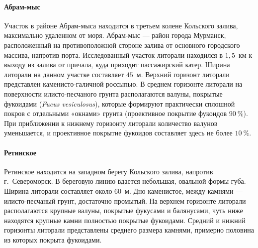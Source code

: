             \paragraph{Абрам-мыс}
Участок  в районе  Абрам-мыса  находится в третьем колене Кольского залива, максимально удаленном от моря.
Абрам-мыс --- район   города   Мурманск,  расположенный   на противоположной стороне залива от основного городского массива, напротив порта. 
Исследованный участок   литорали   находился   в   $1,5$~км   к   выходу   из   залива   от   причала,   куда   приходит пассажирский катер. 
Ширина   литорали   на   данном   участке   составляет   $45$~м.   
Верхний   горизонт   литорали представлен  каменисто-галичной  россыпью. 
В среднем  горизонте литорали на поверхности илисто-песчаного   грунта   располагаются   валуны,   покрытые   фукоидами   ({\it Fucus  vesiculosus}), которые   формируют   практически   сплошной   покров   с   отдельными   «окнами»   грунта (проективное  покрытие фукоидов $90~\%$).  
При приближении  к нижнему горизонту литорали количество   валунов   уменьшается,   и   проективное   покрытие   фукоидов   составляет   здесь   не более $10~\%$.

    \paragraph{Ретинское}
Ретинское находится на западном берегу Кольского залива, напротив г.~Североморск. 
В береговую линию вдается небольшая, овальной формы губа. 
Ширина литорали составляет около $60$~м. 
Дно каменистое, между камнями --- илисто-песчаный грунт, достаточно промытый. 
На верхнем горизонте литорали располагаются крупные валуны, покрытые фукусами и балянусами, чуть ниже находятся крупные камни полностью покрытые фукоидами.
Средний и нижний горизонты литорали представлены среднего размера камнями, примерно половина из которых покрыта фукоидами. 

